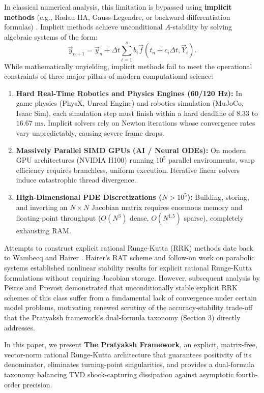 \documentclass[11pt,a4paper]{article}
\theoremstyle{definition}
\begin{document}
In classical numerical analysis, this limitation is bypassed using \textbf{implicit methods} (e.g., Radau IIA, Gauss-Legendre, or backward differentiation formulas) \cite{hairer1996solving}. Implicit methods achieve unconditional $A$-stability by solving algebraic systems of the form:
\begin{equation}
    \vec{y}_{n+1} = \vec{y}_n + \Delta t \sum_{i=1}^s b_i \vec{f}(t_n + c_i \Delta t, \vec{Y}_i).
\end{equation}
While mathematically unyielding, implicit methods fail to meet the operational constraints of three major pillars of modern computational science:
\begin{enumerate}
    \item \textbf{Hard Real-Time Robotics and Physics Engines (60/120 Hz):} In game physics (PhysX, Unreal Engine) and robotics simulation (MuJoCo, Isaac Sim), each simulation step must finish within a hard deadline of $8.33$ to $16.67\text{ ms}$. Implicit solvers rely on Newton iterations whose convergence rates vary unpredictably, causing severe frame drops.
    \item \textbf{Massively Parallel SIMD GPUs (AI / Neural ODEs):} On modern GPU architectures (NVIDIA H100) running $10^5$ parallel environments, warp efficiency requires branchless, uniform execution. Iterative linear solvers induce catastrophic thread divergence.
    \item \textbf{High-Dimensional PDE Discretizations ($N > 10^5$):} Building, storing, and inverting an $N \times N$ Jacobian matrix requires enormous memory and floating-point throughput ($O(N^3)$ dense, $O(N^{1.5})$ sparse), completely exhausting RAM.
\end{enumerate}

Attempts to construct explicit rational Runge-Kutta (RRK) methods date back to Wambecq \cite{wambecq1978} and Hairer \cite{hairer1979rat, hairer1980}. Hairer's RAT scheme \cite{hairer1979rat} and follow-on work on parabolic systems \cite{hairer1980} established nonlinear stability results for explicit rational Runge-Kutta formulations without requiring Jacobian storage. However, subsequent analysis by Peirce and Prevost \cite{peirce1986} demonstrated that unconditionally stable explicit RRK schemes of this class suffer from a fundamental lack of convergence under certain model problems, motivating renewed scrutiny of the accuracy-stability trade-off that the Pratyaksh framework's dual-formula taxonomy (Section 3) directly addresses.

In this paper, we present \textbf{The Pratyaksh Framework}, an explicit, matrix-free, vector-norm rational Runge-Kutta architecture that guarantees positivity of its denominator, eliminates turning-point singularities, and provides a dual-formula taxonomy balancing TVD shock-capturing dissipation against asymptotic fourth-order precision.
\end{document}
